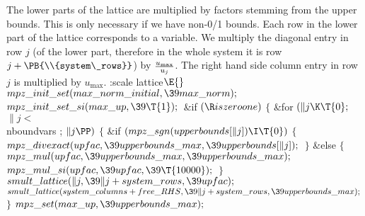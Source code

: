 The lower parts of the lattice are multiplied by factors stemming
from the upper bounds. This is only necessary if we have non-0/1 bounds.
Each row in the lower part of the lattice corresponds to a variable.
We multiply the diagonal entry in row $j$ (of the lower part,
therefore in the whole system it is row  $j+ \PB{\\{system\_rows}}$) by
${u_{\max}\over u_j}$.
The right hand side column entry in row $j$ is multiplied by
$u_{\max}$.
\Y\B\4:scale lattice\X${}\E{}$\6
$\\{mpz\_init\_set}(\\{max\_norm\_initial},\39\\{max\_norm});{}$\6
${}\\{mpz\_init\_set\_si}(\\{max\_up},\39\T{1});{}$\6
\&{if} ${}(\R\\{iszeroone}){}$\5
${}\{{}$\1\6
\&{for} ${}(\|j\K\T{0};{}$ ${}\|j<{}$\\{nboundvars}%
\6
; ${}\|j\PP){}$\5
${}\{{}$\1\6
\&{if} ${}(\\{mpz\_sgn}(\\{upperbounds}[\|j])\I\T{0}){}$\5
${}\{{}$\1\6
${}\\{mpz\_divexact}(\\{upfac},\39\\{upperbounds\_max},\39\\{upperbounds}[%
\|j]);{}$\6
\4${}\}{}$\2\6
\&{else}\5
${}\{{}$\1\6
${}\\{mpz\_mul}(\\{upfac},\39\\{upperbounds\_max},\39\\{upperbounds\_max});{}$\6
${}\\{mpz\_mul\_si}(\\{upfac},\39\\{upfac},\39\T{10000});{}$\6
\4${}\}{}$\2\6
${}\\{smult\_lattice}(\|j,\39\|j+\\{system\_rows},\39\\{upfac});{}$\6
${}\\{smult\_lattice}(\\{system\_columns}+\\{free\_RHS},\39\|j+\\{system%
\_rows},\39\\{upperbounds\_max});{}$\6
\4${}\}{}$\2\6
${}\\{mpz\_set}(\\{max\_up},\39\\{upperbounds\_max});{}$\6
